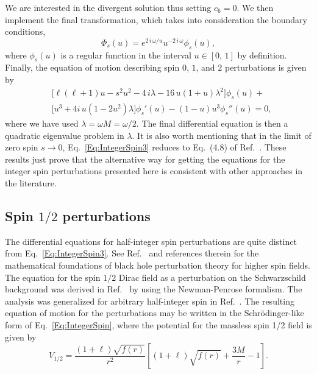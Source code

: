 %
We are interested in the divergent solution thus setting $c_6=0$. We then implement the final transformation, which takes into consideration the boundary conditions,
%
\begin{equation}\label{Eq:FinalTrans}
  \Phi_{s}(u)=e^{2\,i\,\omega/u}u^{-2\,i\,\omega}\phi_{s}(u),
\end{equation}
%
where $\phi_{s}(u)$ is a regular function in the interval $u\in[0,\,1]$ by definition. Finally, the equation of motion describing spin $0$, $1$, and $2$ perturbations is given by
%
\begin{equation}\label{Eq:IntegerSpin3}
  \begin{split}
    &\!\!\Big[\ell\left(\ell+1\right) u -s^2u^2-4\,i\lambda-16\,u\left(1+u\right)\lambda^2\Big]\phi_{s}(u)+\\
    & \!\!\Big[u^3+4i\,u\left(1-2u^2\right)\lambda\Big]\phi_{s}'(u)-(1-u)u^3\phi_{s}''(u)=0,
  \end{split}
\end{equation}
%
where we have used $\lambda=\omega M=\omega/2$. The final differential equation is then a quadratic eigenvalue problem in $\lambda$. It is also worth mentioning that in the limit of zero spin $s\to 0$, Eq.~\eqref{Eq:IntegerSpin3} reduces to Eq.~(4.8) of Ref.~\cite{qnmspectral}. These results just prove that the alternative way for getting the equations for the integer spin perturbations presented here is consistent with other approaches in the literature.

\subsection{Spin $1/2$ perturbations}

The differential equations for half-integer spin perturbations are quite distinct from Eq.~\eqref{Eq:IntegerSpin3}. See Ref.~\cite{Chandrasekhar1998-le} and references therein for the mathematical foundations of black hole perturbation theory for higher spin fields. The equation for the spin $1/2$ Dirac field as a perturbation on the Schwarzschild background was derived in Ref.~\cite{Cho:2003qe} by using the Newman-Penrose formalism. The analysis was generalized for arbitrary half-integer spin in Ref.~\cite{Shu:2005fw}. The resulting equation of motion for the perturbations may be written in the Schr\"odinger-like form of Eq.~\eqref{Eq:IntegerSpin}, where the potential for the massless spin 1/2 field is given by
%
\begin{equation}\label{eq:pot-s12}
  V_{\scriptscriptstyle{1/2}}= \frac{\left(1+\ell\right)\sqrt{f(r)}}{r^{2}} \left[\left(1+\ell\right)\sqrt{f(r)}+\frac{3M}{r}-1\right].
\end{equation}

